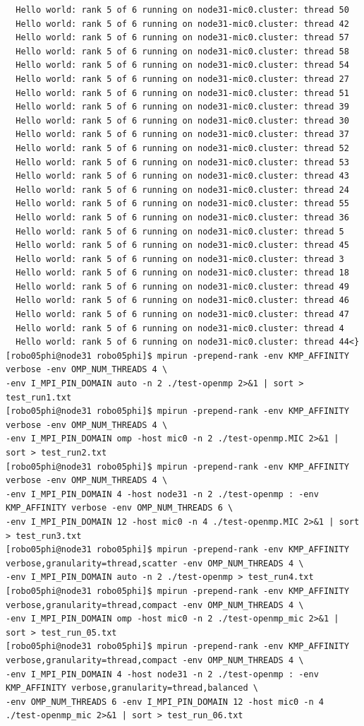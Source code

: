 \documentclass[pscyr,10pt]{hedlab}
\begin{document}
\begin{lstlisting}
  Hello world: rank 5 of 6 running on node31-mic0.cluster: thread 50
  Hello world: rank 5 of 6 running on node31-mic0.cluster: thread 42
  Hello world: rank 5 of 6 running on node31-mic0.cluster: thread 57
  Hello world: rank 5 of 6 running on node31-mic0.cluster: thread 58
  Hello world: rank 5 of 6 running on node31-mic0.cluster: thread 54
  Hello world: rank 5 of 6 running on node31-mic0.cluster: thread 27
  Hello world: rank 5 of 6 running on node31-mic0.cluster: thread 51
  Hello world: rank 5 of 6 running on node31-mic0.cluster: thread 39
  Hello world: rank 5 of 6 running on node31-mic0.cluster: thread 30
  Hello world: rank 5 of 6 running on node31-mic0.cluster: thread 37
  Hello world: rank 5 of 6 running on node31-mic0.cluster: thread 52
  Hello world: rank 5 of 6 running on node31-mic0.cluster: thread 53
  Hello world: rank 5 of 6 running on node31-mic0.cluster: thread 43
  Hello world: rank 5 of 6 running on node31-mic0.cluster: thread 24
  Hello world: rank 5 of 6 running on node31-mic0.cluster: thread 55
  Hello world: rank 5 of 6 running on node31-mic0.cluster: thread 36
  Hello world: rank 5 of 6 running on node31-mic0.cluster: thread 5
  Hello world: rank 5 of 6 running on node31-mic0.cluster: thread 45
  Hello world: rank 5 of 6 running on node31-mic0.cluster: thread 3
  Hello world: rank 5 of 6 running on node31-mic0.cluster: thread 18
  Hello world: rank 5 of 6 running on node31-mic0.cluster: thread 49
  Hello world: rank 5 of 6 running on node31-mic0.cluster: thread 46
  Hello world: rank 5 of 6 running on node31-mic0.cluster: thread 47
  Hello world: rank 5 of 6 running on node31-mic0.cluster: thread 4
  Hello world: rank 5 of 6 running on node31-mic0.cluster: thread 44<}
[robo05phi@node31 robo05phi]$ mpirun -prepend-rank -env KMP_AFFINITY verbose -env OMP_NUM_THREADS 4 \
-env I_MPI_PIN_DOMAIN auto -n 2 ./test-openmp 2>&1 | sort > test_run1.txt
[robo05phi@node31 robo05phi]$ mpirun -prepend-rank -env KMP_AFFINITY verbose -env OMP_NUM_THREADS 4 \
-env I_MPI_PIN_DOMAIN omp -host mic0 -n 2 ./test-openmp.MIC 2>&1 | sort > test_run2.txt
[robo05phi@node31 robo05phi]$ mpirun -prepend-rank -env KMP_AFFINITY verbose -env OMP_NUM_THREADS 4 \
-env I_MPI_PIN_DOMAIN 4 -host node31 -n 2 ./test-openmp : -env KMP_AFFINITY verbose -env OMP_NUM_THREADS 6 \
-env I_MPI_PIN_DOMAIN 12 -host mic0 -n 4 ./test-openmp.MIC 2>&1 | sort > test_run3.txt
[robo05phi@node31 robo05phi]$ mpirun -prepend-rank -env KMP_AFFINITY verbose,granularity=thread,scatter -env OMP_NUM_THREADS 4 \
-env I_MPI_PIN_DOMAIN auto -n 2 ./test-openmp > test_run4.txt 
[robo05phi@node31 robo05phi]$ mpirun -prepend-rank -env KMP_AFFINITY verbose,granularity=thread,compact -env OMP_NUM_THREADS 4 \
-env I_MPI_PIN_DOMAIN omp -host mic0 -n 2 ./test-openmp_mic 2>&1 | sort > test_run_05.txt
[robo05phi@node31 robo05phi]$ mpirun -prepend-rank -env KMP_AFFINITY verbose,granularity=thread,compact -env OMP_NUM_THREADS 4 \
-env I_MPI_PIN_DOMAIN 4 -host node31 -n 2 ./test-openmp : -env KMP_AFFINITY verbose,granularity=thread,balanced \
-env OMP_NUM_THREADS 6 -env I_MPI_PIN_DOMAIN 12 -host mic0 -n 4 ./test-openmp_mic 2>&1 | sort > test_run_06.txt
\end{lstlisting}
\end{document}
